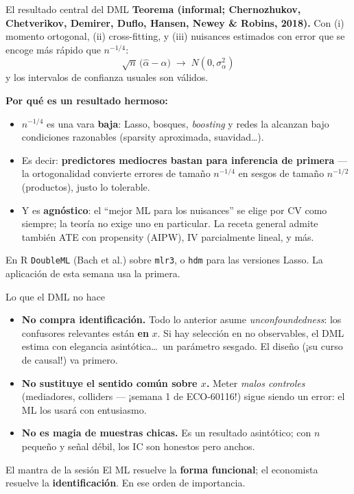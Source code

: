 \documentclass{beamer}
\newcommand{\1}{\mathbb{I}}
\begin{document}
\begin{frame}{El resultado central del DML}
\small
\textbf{Teorema (informal; Chernozhukov, Chetverikov, Demirer, Duflo, Hansen, Newey \& Robins, 2018).} Con (i) momento ortogonal, (ii) cross-fitting, y (iii) nuisances estimados con error que se encoge más rápido que $n^{-1/4}$:
\[ \sqrt{n}\,\big( \hat{\alpha} - \alpha \big) \;\longrightarrow\; N(0, \sigma_\alpha^2) \]
y los intervalos de confianza usuales son válidos.
\pause

\vspace{0.2cm}
\textbf{Por qué es un resultado hermoso:}
\begin{itemize}\itemsep5pt
  \item $n^{-1/4}$ es una vara \textbf{baja}: Lasso, bosques, \emph{boosting} y redes la alcanzan bajo condiciones razonables (sparsity aproximada, suavidad\ldots).
  \item Es decir: \textbf{predictores mediocres bastan para inferencia de primera} --- la ortogonalidad convierte errores de tamaño $n^{-1/4}$ en sesgos de tamaño $n^{-1/2}$ (productos), justo lo tolerable. \pause
  \item Y es \textbf{agnóstico}: el ``mejor ML para los nuisances'' se elige por CV como siempre; la teoría no exige uno en particular. La receta general admite también ATE con propensity (AIPW), IV parcialmente lineal, y más.
\end{itemize}
\pause

\begin{block}{En R}
\texttt{DoubleML} (Bach et al.) sobre \texttt{mlr3}, o \texttt{hdm} para las versiones Lasso. La aplicación de esta semana usa la primera.
\end{block}
\end{frame}

\begin{frame}{Lo que el DML no hace}
\small
\begin{itemize}\itemsep6pt
  \item \textbf{No compra identificación.} Todo lo anterior asume \emph{unconfoundedness}: los confusores relevantes están \textbf{en} $x$. Si hay selección en no observables, el DML estima con elegancia asintótica\ldots\ un parámetro sesgado. El diseño (¡su curso de causal!) va primero. \pause
  \item \textbf{No sustituye el sentido común sobre $x$.} Meter \emph{malos controles} (mediadores, colliders --- ¡semana 1 de ECO-60116!) sigue siendo un error: el ML los usará con entusiasmo. \pause
  \item \textbf{No es magia de muestras chicas.} Es un resultado asintótico; con $n$ pequeño y señal débil, los IC son honestos pero anchos. \pause
\end{itemize}

\vspace{0.15cm}
\begin{block}{El mantra de la sesión}
El ML resuelve la \textbf{forma funcional}; el economista resuelve la \textbf{identificación}. En ese orden de importancia.
\end{block}
\end{frame}
\end{document}
